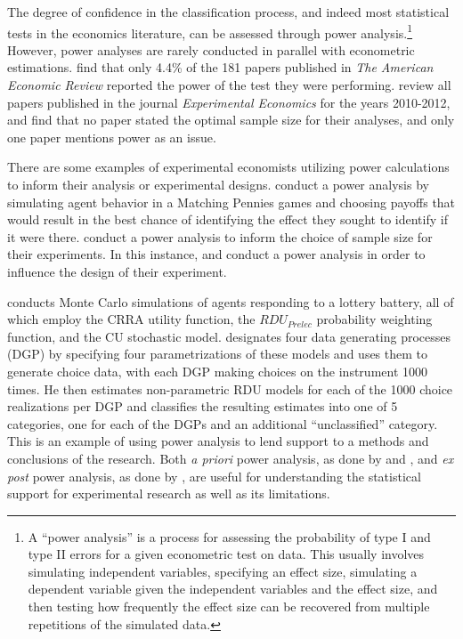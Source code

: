 \documentclass[../main.tex]{subfiles}
\begin{document}
The degree of confidence in the classification process, and indeed most statistical tests in the economics literature, can be assessed through power analysis.\footnote{
	A \enquote{power analysis} is a process for assessing the probability of type I and type II errors for a given econometric test on data.
	This usually involves simulating independent variables, specifying an effect size, simulating a dependent variable given the independent variables and the effect size, and then testing how frequently the effect size can be recovered from multiple repetitions of the simulated data.
}
However, power analyses are rarely conducted in parallel with econometric estimations.
\textcite{McCloskey1996} find that only 4.4\% of the 181 papers published in \textit{The American Economic Review} reported the power of the test they were performing.
\textcite[6]{Zhang2013} review all papers published in the journal \textit{Experimental Economics} for the years 2010-2012, and find that no paper stated the optimal sample size for their analyses, and only one paper mentions power as an issue.

There are some examples of experimental economists utilizing power calculations to inform their analysis or experimental designs.
\textcite{Rutstrom2009} conduct a power analysis by simulating agent behavior in a Matching Pennies games and choosing payoffs that would result in the best chance of identifying the effect they sought to identify if it were there.
\textcite[2]{Brown2016} conduct a power analysis to inform the choice of sample size for their experiments.
In this instance, \textcite{Rutstrom2009} and \textcite{Brown2016} conduct a power analysis in order to influence the design of their experiment.

\textcite[8]{Wilcox2015} conducts Monte Carlo simulations of agents responding to a lottery battery, all of which employ the CRRA utility function, the $\mathit{RDU_{Prelec}}$ probability weighting function, and the CU stochastic model.
\textcite{Wilcox2015} designates four data generating processes (DGP) by specifying four parametrizations of these models and uses them to generate choice data, with each DGP making choices on the instrument 1000 times.
He then estimates non-parametric RDU models for each of the 1000 choice realizations per DGP and classifies the resulting estimates into one of 5 categories, one for each of the DGPs and an additional \enquote{unclassified} category.
This is an example of using power analysis to lend support to a methods and conclusions of the research.
Both \textit{a priori} power analysis, as done by \textcite{Rutstrom2009} and \textcite{Brown2016}, and \textit{ex post} power analysis, as done by \textcite{Wilcox2015}, are useful for understanding the statistical support for experimental research as well as its limitations.
\end{document}
